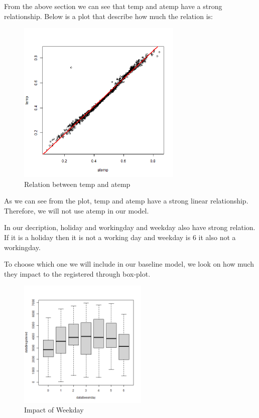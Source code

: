 From the above section we can see that temp and atemp have a strong relationship. Below is a plot that describe how much the relation is:

\begin{figure}[H]
\centering
\includegraphics[width=0.7\textwidth]{img/temp_atemp.png}
\caption{Relation between temp and atemp}
\label{fig:relation_between_temp_and_atemp}
\end{figure}


As we can see from the plot, temp and atemp have a strong linear relationship. Therefore, we will not use atemp in our model.

In our decription, holiday and workingday and weekday also have strong relation. If it is a holiday then it is not a working day and weekday is 6 it also not a workingday.  

To choose which one we will include in our baseline model, we look on how much they impact to the registered through box-plot.

\begin{figure}[H]
\centering
\includegraphics[width=0.55\textwidth]{img/weekday.png}
\caption{Impact of Weekday}
\label{fig:scaled_revenue_distribution}
\end{figure}

